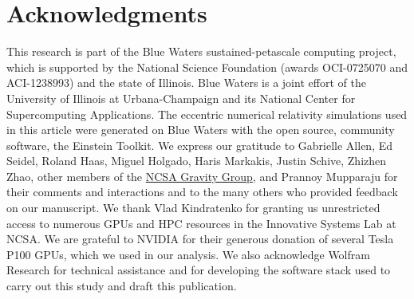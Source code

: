 \documentclass[aps,prd,%
amsmath,floats,floatfix, twocolumn, superscriptaddress,nofootinbib,showpacs]{revtex4-1}
\begin{document}
\section*{Acknowledgments}

This research is part of the Blue Waters sustained-petascale computing project, which is supported by the National Science Foundation (awards OCI-0725070 and ACI-1238993) and the state of Illinois. Blue Waters is a joint effort of the University of Illinois at Urbana-Champaign and its National Center for Supercomputing Applications. The eccentric numerical relativity simulations used in this article were generated on Blue Waters with the open source, community software, the Einstein Toolkit. We express our gratitude to Gabrielle Allen, Ed Seidel, Roland Haas, Miguel Holgado, Haris Markakis, Justin Schive, Zhizhen Zhao, other members of the \href{http://gravity.ncsa.illinois.edu}{NCSA Gravity Group}, and Prannoy Mupparaju for their comments and interactions and to the many others who provided feedback on our manuscript. We thank Vlad Kindratenko for granting us unrestricted access to numerous GPUs and HPC resources in the Innovative Systems Lab at NCSA. We are grateful to NVIDIA for their generous donation of several Tesla P100 GPUs, which we used in our analysis. We also acknowledge Wolfram Research for technical assistance and for developing the software stack used to carry out this study and draft this publication.











\end{document}
